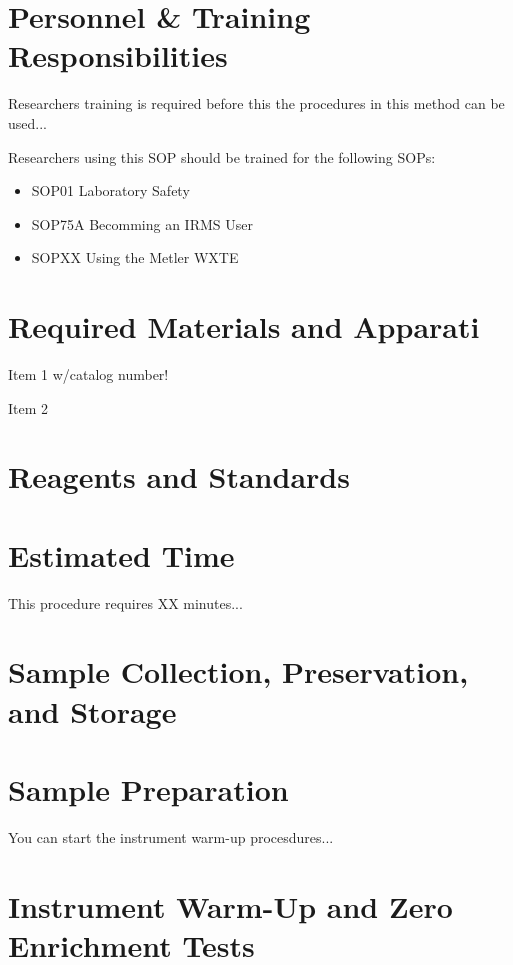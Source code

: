 \documentclass[12pt]{../SOP3_beta}\usepackage[]{graphicx}\usepackage[]{color}
\begin{document}
\section{Personnel \& Training Responsibilities}

\NP Researchers training is required before this the procedures in this method can be used... 

\NP Researchers using this SOP should be trained for the following SOPs:

\begin{itemize}
  \item SOP01 Laboratory Safety
  \item SOP75A Becomming an IRMS User
  \item SOPXX Using the Metler WXTE
\end{itemize}

\section{Required Materials and Apparati}

\NP Item 1 w/catalog number!

\NP Item 2

\section{Reagents and Standards}

\section{Estimated Time}

\NP This procedure requires XX minutes...

\section{Sample Collection, Preservation, and Storage}


\section{Sample Preparation}

\NP You can start the instrument warm-up procesdures... 

\section{Instrument Warm-Up and Zero Enrichment Tests}
\end{document}
